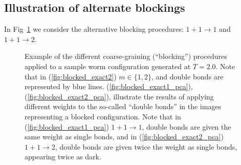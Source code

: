 \documentclass[../main.tex]{subfiles}
\begin{document}
\subsection{Illustration of alternate blockings}%
\label{subsec:altb}
In Fig~\ref{fig:alt_blockings} we consider the alternative blocking procedures: $1 + 1 \rightarrow 1$ and $1 + 1
\rightarrow 2$.
%
\begin{figure}[htpb]
    \centering
    \hfill
    \centering
    \hfill
    \hfill
    \caption{Example of the different coarse-graining (``blocking'') procedures applied to a sample worm configuration
      generated at $T = 2.0$. Note that in (\ref{fig:blocked_exact2}) $m \in \{1, 2\}$, and double bonds are
      represented by blue lines.  (\ref{fig:blocked_exact1_pca}), (\ref{fig:blocked_exact2_pca}), illustrate the
      results of applying different weights to the so-called ``double bonds'' in the images representing a blocked
      configuration. Note that in (\ref{fig:blocked_exact1_pca}) $1+1\rightarrow 1$, double bonds are given the same
      weight as single bonds, and in (\ref{fig:blocked_exact2_pca}) $1+1\rightarrow 2$, double bonds are given twice
      the weight as single bonds, appearing twice as dark.}\label{fig:double_bond_weights}%
\label{fig:alt_blockings}
\end{figure}
%
\end{document}
